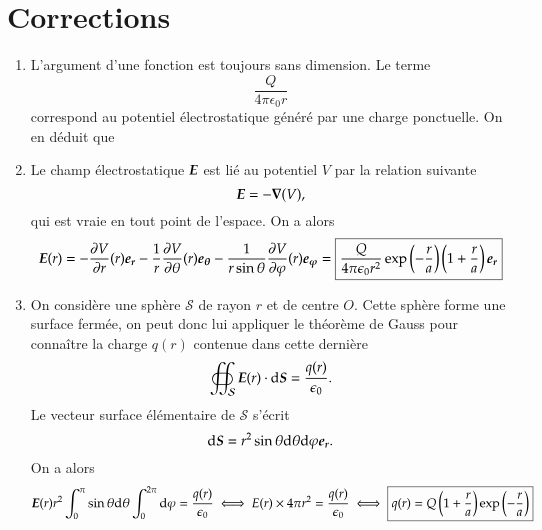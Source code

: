\section{Corrections}
\begin{corrige}
\begin{enumerate}
	\item L'argument d'une fonction est toujours sans dimension.  Le terme 
	  \begin{equation*}
	  	\dfrac{Q}{4 \pi \epsilon_0 r}
	 \end{equation*}
	  correspond au potentiel électrostatique généré par une charge ponctuelle.
	  On en déduit que 

  	\item Le champ électrostatique $\vece$ est lié au potentiel $V$ par la
          relation suivante
	  \begin{equation*}
		  \vece = - \grad(V),
	  \end{equation*}
	  qui est vraie en tout point de l'espace. On a alors
	  \begin{equation*}
		  \vece(r) = - \dd{V}{r}(r)\er -\dfrac{1}{r}\dd{V}{\theta}(r)\etheta
		  -\dfrac{1}{r\sin\theta}\dd{V}{\phi}(r)\ephi
		  = \boxed{\dfrac{Q}{4 \pi \epsilon_0 r^2}\exp\left(-\dfrac{r}{a}
		    \right)\left(1 + \dfrac{r}{a}\right)\er}
	  \end{equation*}

  	\item On considère une sphère $\mathcal{S}$ de rayon $r$ et de centre $O$.
	  Cette sphère forme une surface fermée, on peut donc lui appliquer le
	  théorème de Gauss pour connaître la charge $q(r)$ contenue dans cette 
	  dernière
	  \begin{equation*}
		  \oiint_\mathcal{S} \vece(r) \cdot \ds = \dfrac{q(r)}{\epsilon_0}.
	  \end{equation*}
	  Le vecteur surface élémentaire de $\mathcal{S}$ s'écrit
	  \begin{equation*}
		  \ds = r^2 \sin\theta\dtheta\dphi \er.
	  \end{equation*}
	  On a alors
	  \begin{equation*}
		  \vece(r)r^2 \int_0^\pi \sin\theta\dtheta 
		  \int_0^{2\pi} \dphi = \dfrac{q(r)}{\epsilon_0}
		  \iff E(r) \times 4 \pi r^2 = \dfrac{q(r)}{\epsilon_0}
		  \iff \boxed{q(r) = Q\left(1 + \dfrac{r}{a}\right)
			  \exp\left(-\dfrac{r}{a}\right)}
	 \end{equation*}


\end{enumerate}
\end{corrige}
